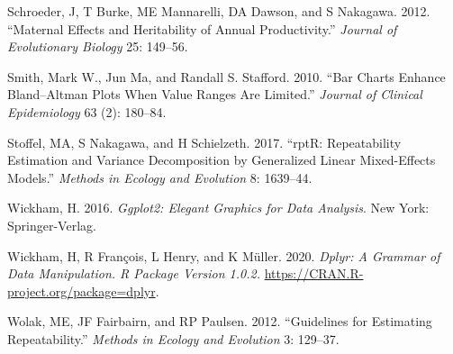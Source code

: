 \begin{CSLReferences}{1}{0}
\leavevmode{}%
Schroeder, J, T Burke, ME Mannarelli, DA Dawson, and S Nakagawa. 2012. {``Maternal Effects and Heritability of Annual Productivity.''} \emph{Journal of Evolutionary Biology} 25: 149--56.

\leavevmode{}%
Smith, Mark W., Jun Ma, and Randall S. Stafford. 2010. {``Bar Charts Enhance Bland--Altman Plots When Value Ranges Are Limited.''} \emph{Journal of Clinical Epidemiology} 63 (2): 180--84.

\leavevmode{}%
Stoffel, MA, S Nakagawa, and H Schielzeth. 2017. {``rptR: Repeatability Estimation and Variance Decomposition by Generalized Linear Mixed-Effects Models.''} \emph{Methods in Ecology and Evolution} 8: 1639--44.

\leavevmode{}%
Wickham, H. 2016. \emph{Ggplot2: Elegant Graphics for Data Analysis}. New York: Springer-Verlag.

\leavevmode{}%
Wickham, H, R François, L Henry, and K Müller. 2020. \emph{Dplyr: A Grammar of Data Manipulation. R Package Version 1.0.2.} \url{https://CRAN.R-project.org/package=dplyr}.

\leavevmode{}%
Wolak, ME, JF Fairbairn, and RP Paulsen. 2012. {``Guidelines for Estimating Repeatability.''} \emph{Methods in Ecology and Evolution} 3: 129--37.

\end{CSLReferences}



\address{%
Josep L. Carrasco\\
University of Barcelona\\%
Biostatistics. Department of Basic Clinical Practice\\ Casanova 143, 08036, Barcelona, Spain\\
%
\url{https://webgrec.ub.edu/webpages/personal/ang/005037_jlcarrasco.ub.edu.html}\\%
\textit{ORCiD: \href{https://orcid.org/0000-0003-1184-0753}{0000-0003-1184-0753}}\\%
\href{mailto:jlcarrasco@ub.edu}{\nolinkurl{jlcarrasco@ub.edu}}%
}
